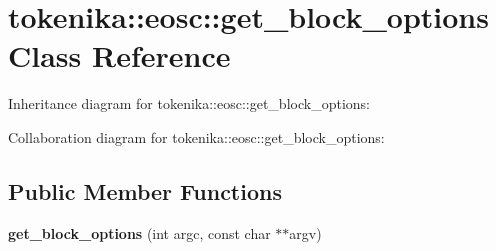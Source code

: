 \hypertarget{classtokenika_1_1eosc_1_1get__block__options}{}\section{tokenika\+:\+:eosc\+:\+:get\+\_\+block\+\_\+options Class Reference}
\label{classtokenika_1_1eosc_1_1get__block__options}


Inheritance diagram for tokenika\+:\+:eosc\+:\+:get\+\_\+block\+\_\+options\+:


Collaboration diagram for tokenika\+:\+:eosc\+:\+:get\+\_\+block\+\_\+options\+:
\subsection*{Public Member Functions}
\begin{DoxyCompactItemize}
\item 
\mbox{\label{classtokenika_1_1eosc_1_1get__block__options_a9e525acf9a7ebe91ce8d27edfdd88a88}} 
{\bfseries get\+\_\+block\+\_\+options} (int argc, const char $\ast$$\ast$argv)
\end{DoxyCompactItemize}

